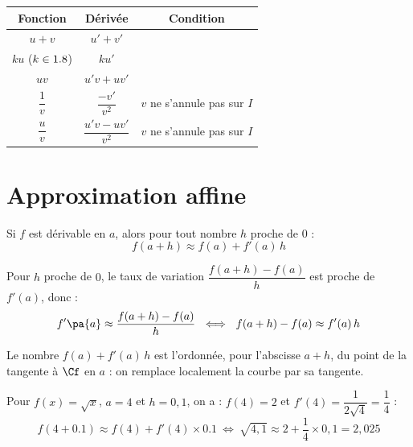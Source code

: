 \begin{propriete}
	\nline
	\begin{center}
		\begin{tabular}{|c|c|c|} \hline
			\ccg\textbf{Fonction}                & \ccg\textbf{Dérivée}     & \ccg\textbf{Condition}      \\ \hline
			$u + v$                              & $u' + v'$                &                             \\ \hline
			$ku$ ($k \in 1.8$)                    & $ku'$                    &                             \\ \hline
			$uv$                                 & $u'v + uv'$              &                             \\ \hline
			\rule[-4mm]{0mm}{11mm}$\dfrac{1}{v}$ & $\dfrac{-v'}{v^2}$       & $v$ ne s'annule pas sur $I$ \\ \hline
			\rule[-4mm]{0mm}{11mm}$\dfrac{u}{v}$ & $\dfrac{u'v - uv'}{v^2}$ & $v$ ne s'annule pas sur $I$ \\ \hline
		\end{tabular}
	\end{center}
\end{propriete}

\section{Approximation affine}

\begin{propriete}
	Si $f$ est dérivable en $a$, alors pour tout nombre $h$ proche de $0$ :
	\[
		f(a + h) \approx f(a) + f'(a)\,h
	\]

\end{propriete}

\begin{rem}
	Pour $h$ proche de $0$, le taux de variation $\dfrac{f(a + h) - f(a)}{h}$ est proche de $f'(a)$, donc :
	\[
		f'\pa{a}\approx\dfrac{f(a + h) - f(a)}{h}~\iff~f(a + h) - f(a) \approx f'(a)\,h
	\]

	Le nombre $f(a) + f'(a)\,h$ est l'ordonnée, pour l'abscisse $a + h$, du point de la tangente à $\Cf$ en $a$ : on remplace localement la courbe par sa tangente.
\end{rem}

\newpage

\begin{ex}
	Pour $f(x) = \sqrt{x}$, $a = 4$ et $h = 0{,}1$, on a : $f(4) = 2$ et $f'(4) = \dfrac{1}{2\sqrt{4}} = \dfrac{1}{4}$ :
	\[
		f(4 + 0.1) \approx f(4) + f'(4)\times 0.1~\iff~\sqrt{4{,}1} \approx 2 + \dfrac{1}{4} \times 0{,}1 = 2{,}025
	\]
\end{ex}

